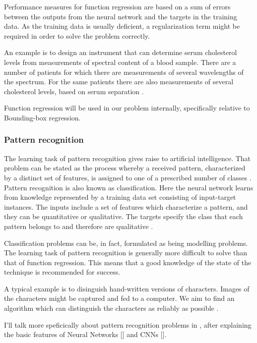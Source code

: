 Performance measures for function regression are based on a sum of errors between the outputs from the neural network and the targets in the training data. 
As the training data is usually deficient, a regularization term might be required in order to solve the problem correctly.

An example is to design an instrument that can determine serum cholesterol levels from
measurements of spectral content of a blood sample. There are a number of 
patients for which there are measurements of several wavelengths of the spectrum.
For the same patients there are also measurements of several
cholesterol levels, based on serum separation \cite{Demuth2009}.

Function regression will be used in our problem internally, specifically relative to Bounding-box regression.


\subsubsection{Pattern recognition}\label{s:ltask-patt}

The learning task of pattern recognition gives raise to artificial intelligence. That problem can be stated as the process whereby a received pattern, characterized by a distinct
set of features, is assigned to one of a prescribed number of
classes \cite{Haykin1994}. Pattern recognition is also known as classification. Here the neural network learns from knowledge represented by a training data set consisting of input-target instances. The inputs include a set of features which characterize a pattern, and they can be quantitative or qualitative. The targets specify the class that each pattern belongs to and therefore are qualitative \cite{Bishop1995}.

Classification problems can be, in fact, formulated as being modelling problems. 
The learning task of pattern recognition is generally more difficult to solve than that of function regression. 
This means that a good knowledge of the state of the technique is recommended for success. 

A typical example is to disinguish hand-written versions of characters. 
Images of the characters might be captured and fed to a computer. 
We aim to find an algorithm which can distinguish the characters as reliably as possible  \cite{Bishop1995}. 

I'll talk more speficically about pattern recognition problems in , after explaining the basic features of Neural Networks [] and CNNs [].

